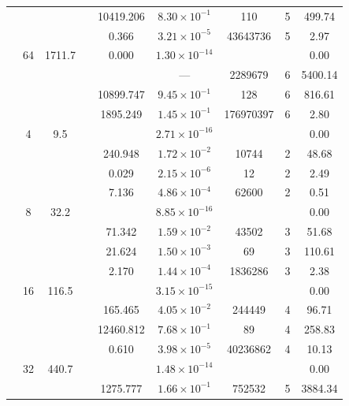\begin{table}[htbp]
\begin{tabular}{l S[table-format=3.0] S[table-format=4.1] l S[table-format=3.3] S[table-format=1.2e2] S[table-format=6.0] S[table-format=2.0] S[table-format=4.2]}
     &  &  &  & 10419.206 & $8.30 \times 10^{-1}$ & 110 & 5 & 499.74 \\
     &  &  &  & 0.366 & $3.21 \times 10^{-5}$ & 43643736 & 5 & 2.97 \\
     & 64 & 1711.7 &  & 0.000 & $1.30 \times 10^{-14}$ & {\text{---}} & {\text{---}} & 0.00 \\
     &  &  &  & {\text{---}} & ${\text{---}}$ & 2289679 & 6 & 5400.14 \\
     &  &  &  & 10899.747 & $9.45 \times 10^{-1}$ & 128 & 6 & 816.61 \\
     &  &  &  & 1895.249 & $1.45 \times 10^{-1}$ & 176970397 & 6 & 2.80 \\
    \midrule
     & 4 & 9.5 &  & {\text{---}} & $2.71 \times 10^{-16}$ & {\text{---}} & {\text{---}} & 0.00 \\
     &  &  &  & 240.948 & $1.72 \times 10^{-2}$ & 10744 & 2 & 48.68 \\
     &  &  &  & 0.029 & $2.15 \times 10^{-6}$ & 12 & 2 & 2.49 \\
     &  &  &  & 7.136 & $4.86 \times 10^{-4}$ & 62600 & 2 & 0.51 \\
     & 8 & 32.2 &  & {\text{---}} & $8.85 \times 10^{-16}$ & {\text{---}} & {\text{---}} & 0.00 \\
     &  &  &  & 71.342 & $1.59 \times 10^{-2}$ & 43502 & 3 & 51.68 \\
     &  &  &  & 21.624 & $1.50 \times 10^{-3}$ & 69 & 3 & 110.61 \\
     &  &  &  & 2.170 & $1.44 \times 10^{-4}$ & 1836286 & 3 & 2.38 \\
     & 16 & 116.5 &  & {\text{---}} & $3.15 \times 10^{-15}$ & {\text{---}} & {\text{---}} & 0.00 \\
     &  &  &  & 165.465 & $4.05 \times 10^{-2}$ & 244449 & 4 & 96.71 \\
     &  &  &  & 12460.812 & $7.68 \times 10^{-1}$ & 89 & 4 & 258.83 \\
     &  &  &  & 0.610 & $3.98 \times 10^{-5}$ & 40236862 & 4 & 10.13 \\
     & 32 & 440.7 &  & {\text{---}} & $1.48 \times 10^{-14}$ & {\text{---}} & {\text{---}} & 0.00 \\
     &  &  &  & 1275.777 & $1.66 \times 10^{-1}$ & 752532 & 5 & 3884.34 \\

\end{tabular}
\end{table}
